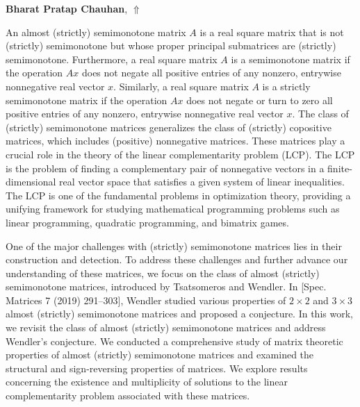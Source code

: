 \documentclass[ILAS2025-program.tex]{subfiles}
\begin{document}
\hypertarget{down0094}{}\begin{ilasabstract}
    
\textbf{Bharat Pratap Chauhan},  \hfill \hyperlink{up0094}{$\Uparrow$}
    
    
\mtskip
    An almost (strictly) semimonotone matrix  $A$ is a real square matrix that is not (strictly) semimonotone but whose proper principal submatrices are (strictly) semimonotone. Furthermore, a real square matrix $A$ is a semimonotone matrix if the operation $Ax$ does not negate all positive entries of any nonzero, entrywise nonnegative real vector $x$. Similarly, a real square matrix $A$ is a strictly semimonotone matrix if the operation $Ax$ does not negate or turn to zero all positive entries of any nonzero, entrywise nonnegative real vector $x$. The class of (strictly) semimonotone matrices generalizes the class of (strictly) copositive matrices, which includes (positive) nonnegative matrices. These matrices play a crucial role in the theory of the linear complementarity problem (LCP). The LCP is the problem of finding a complementary pair of nonnegative vectors in a finite-dimensional real vector space that satisfies a given system of linear inequalities.  The LCP is one of the fundamental problems in optimization theory, providing a unifying framework for studying mathematical programming problems such as linear programming, quadratic programming, and bimatrix games. 
 
One of the major challenges with (strictly) semimonotone matrices lies in their construction and detection. To address these challenges and further advance our understanding of these matrices, we focus on the class of almost (strictly) semimonotone matrices, introduced by Tsatsomeros and Wendler. In [Spec. Matrices 7 (2019) 291--303], Wendler studied various properties of $2 \times 2$  and $3 \times 3$ almost (strictly) semimonotone matrices and proposed a conjecture. In this work, we revisit the class of almost (strictly) semimonotone matrices and address Wendler's conjecture. We conducted a comprehensive study of matrix theoretic properties of almost (strictly) semimonotone matrices and examined the structural and sign-reversing properties of matrices. We explore results concerning the existence and multiplicity of solutions to the linear complementarity problem associated with these matrices.
\end{ilasabstract}
    
\end{document}
